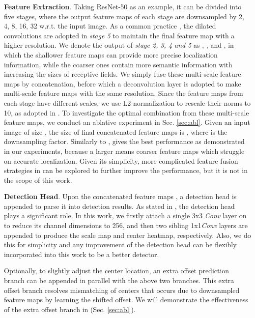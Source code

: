 \documentclass[review]{elsarticle}
\begin{document}
\textbf{Feature Extraction}.
Taking ResNet-50 as an example, it can be divided into five stages, where the output feature maps of each stage are downsampled by 2, 4, 8, 16, 32 w.r.t. the input image. As a common practice \cite{wang2017repulsion,Song_2018_ECCV}, the dilated convolutions are adopted in \emph{stage 5} to maintain the final feature map with a higher resolution. We denote the output of \emph{stage 2, 3, 4 and 5} as , ,  and , in which the shallower feature maps can provide more precise localization information, while the coarser ones contain more semantic information with increasing the sizes of receptive fields. We simply fuse these multi-scale feature maps by concatenation, before which a deconvolution layer is adopted to make multi-scale feature maps with the same resolution. Since the feature maps from each stage have different scales, we use L2-normalization to rescale their norms to 10, as adopted in \cite{Lin_2018_ECCV}. To investigate the optimal combination from these multi-scale feature maps, we conduct an ablative experiment in Sec. \ref{sec:abl}. Given an input image of size , the size of final concatenated feature maps is , where  is the downsampling factor. Similarly to \cite{Song_2018_ECCV},  gives the best performance as demonstrated in our experiments, because a larger  means coarser feature maps which struggle on accurate localization. Given its simplicity, more complicated feature fusion strategies in \cite{lin2016feature,Kim_2018_ECCV,Kong_2018_ECCV} can be explored to further improve the performance, but it is not in the scope of this work.

\textbf{Detection Head}.
Upon the concatenated feature maps , a detection head is appended to parse it into detection results. As stated in \cite{rfbnet}, the detection head plays a significant role. In this work, we firstly attach a single 3x3 \emph{Conv} layer on  to reduce its channel dimensions to 256, and then two sibling 1x1\emph{Conv} layers are appended to produce the scale map and center heatmap, respectively. Also, we do this for simplicity and any improvement of the detection head  \cite{fu2017dssd,rfbnet,li2017light,li2018dsfd} can be flexibly incorporated into this work to be a better detector.

Optionally, to slightly adjust the center location, an extra offset prediction branch can be appended in parallel with the above two branches. This extra offset branch resolves mismatching of centers that occurs due to downsampled feature maps by learning the shifted offset. We will demonstrate the effectiveness of the extra offset branch in (Sec. \ref{sec:abl}).
\end{document}
